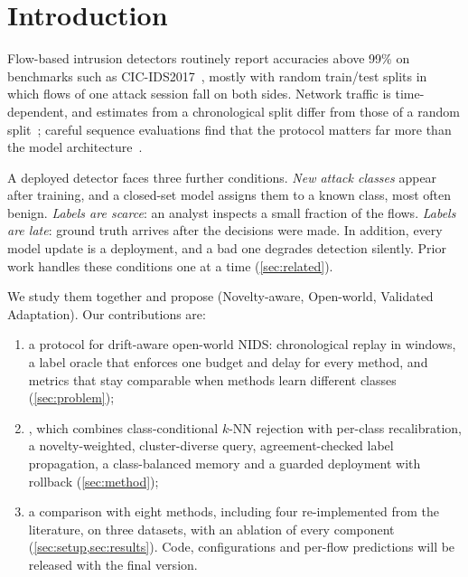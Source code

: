 \section{Introduction}
\label{sec:intro}

Flow-based intrusion detectors routinely report accuracies above 99\% on benchmarks such as
CIC-IDS2017~\cite{sharafaldin2018}, mostly with random train/test splits in which flows of one attack session
fall on both sides. Network traffic is time-dependent, and estimates from a chronological split differ from those
of a random split~\cite{nismara2026temporal}; careful sequence evaluations find that the protocol matters far more
than the model architecture~\cite{moczkodan2026transformers}.

A deployed detector faces three further conditions. \emph{New attack classes} appear after training, and a
closed-set model assigns them to a known class, most often benign. \emph{Labels are scarce}: an analyst inspects
a small fraction of the flows. \emph{Labels are late}: ground truth arrives after the decisions were made. In
addition, every model update is a deployment, and a bad one degrades detection silently. Prior work handles
these conditions one at a time (\cref{sec:related}).

We study them together and propose \nova{} (Novelty-aware, Open-world, Validated Adaptation). Our
contributions are:
\begin{enumerate}
  \item a protocol for drift-aware open-world NIDS: chronological replay in windows, a label oracle that enforces
        one budget and delay for every method, and metrics that stay comparable when methods learn different
        classes (\cref{sec:problem});
  \item \nova{}, which combines class-conditional $k$-NN rejection with per-class recalibration, a
        novelty-weighted, cluster-diverse query, agreement-checked label propagation, a class-balanced memory
        and a guarded deployment with rollback (\cref{sec:method});
  \item a comparison with eight methods, including four re-implemented from the literature, on three datasets,
        with an ablation of every component (\cref{sec:setup,sec:results}). Code, configurations and per-flow
        predictions will be released with the final version.
\end{enumerate}
